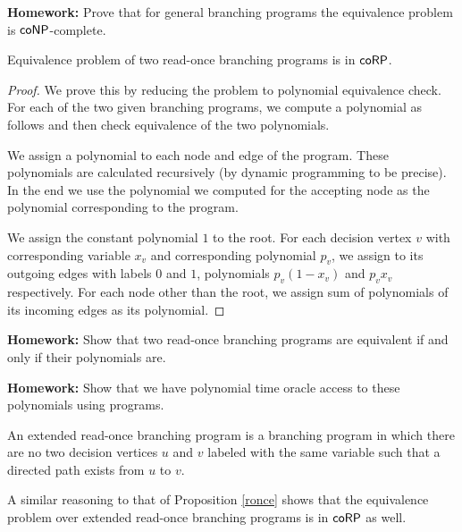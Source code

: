 \textbf{Homework:} Prove that for general branching programs the equivalence problem is $\mathsf{coNP}$-complete.

\begin{proposition}\label{ronce}
Equivalence problem of two read-once branching programs is in $\mathsf{coRP}$.
\end{proposition}
\begin{proof}
We prove this by reducing the problem to polynomial equivalence check. For each of the two given branching programs, we compute a polynomial as follows and then check equivalence of the two polynomials.

We assign a polynomial to each node and edge of the program. These polynomials are calculated recursively (by dynamic programming to be precise). In the end we use the polynomial we computed for the accepting node as the polynomial corresponding to the program.

We assign the constant polynomial $1$ to the root. For each decision vertex $v$ with corresponding variable $x_v$ and corresponding polynomial $p_v$, we assign to its outgoing edges with labels $0$ and $1$, polynomials $p_v(1-x_v)$ and $p_v x_v$ respectively. For each node other than the root, we assign sum of polynomials of its incoming edges as its polynomial.
\end{proof}

\textbf{Homework:} Show that two read-once branching programs are equivalent if and only if their polynomials are.

\textbf{Homework:} Show that we have polynomial time oracle access to these polynomials using programs.

\begin{definition} An extended read-once branching program is a branching program in which there are no two decision vertices $u$ and $v$ labeled with the same variable such that a directed path exists from $u$ to $v$.
\end{definition}

A similar reasoning to that of Proposition \ref{ronce} shows that the equivalence problem over extended read-once branching programs is in $\mathsf{coRP}$ as well.


